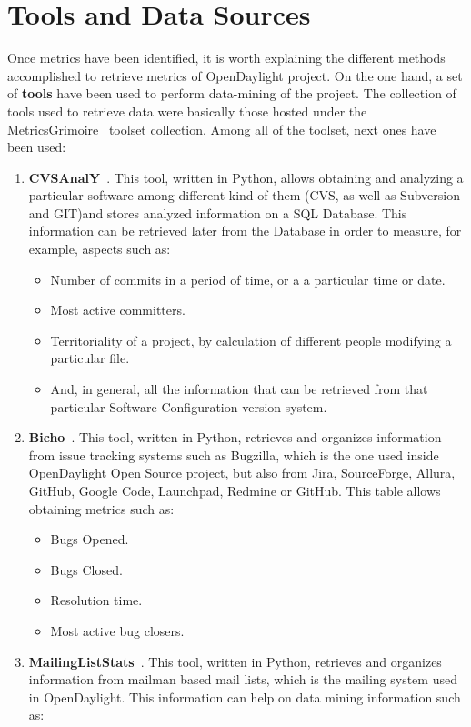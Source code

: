 \documentclass[a4paper, 12pt]{book}
\begin{document}
\section{Tools and Data Sources}
\label{sec:odl_tools_and_data_sources}
Once metrics have been identified, it is worth explaining the different methods accomplished to retrieve metrics of OpenDaylight project. On the one hand, a set of \textbf{tools} have been used to perform data-mining of the project. The collection of tools used to retrieve data were basically those hosted under the MetricsGrimoire~\cite{MetricsGrimore} toolset collection. Among all of the toolset, next ones have been used:
\begin{enumerate}\itemsep0pt
\item{\textbf{CVSAnalY}~\cite{CVSanaly}}. This tool, written in Python, allows obtaining and analyzing a particular software among different kind of them (CVS, as well as Subversion and GIT)and stores analyzed information on a SQL Database. This information can be retrieved later from the Database in order to measure, for example, aspects such as:
\begin{itemize}
\item{Number of commits in a period of time, or a a particular time or date}.
\item{Most active committers}.
\item{Territoriality of a project, by calculation of different people modifying a particular file}.
\item{And, in general, all the information that can be retrieved from that particular Software Configuration version system}.
\end{itemize}
\item{\textbf{Bicho}~\cite{CVSanaly}}. This tool, written in Python, retrieves and organizes information from issue tracking systems such as Bugzilla, which is the one used inside OpenDaylight Open Source project, but also from Jira, SourceForge, Allura, GitHub, Google Code, Launchpad, Redmine or GitHub. This table allows obtaining metrics such as:
\begin{itemize}\itemsep0pt
\item{Bugs Opened}.
\item{Bugs Closed}.
\item{Resolution time}.
\item{Most active bug closers}.
\end{itemize}
\item{\textbf{MailingListStats}~\cite{MailStats}}. This tool, written in Python, retrieves and organizes information from mailman based mail lists, which is the mailing system used in OpenDaylight. This information can help on data mining information such as:

\end{enumerate}
\end{document}
